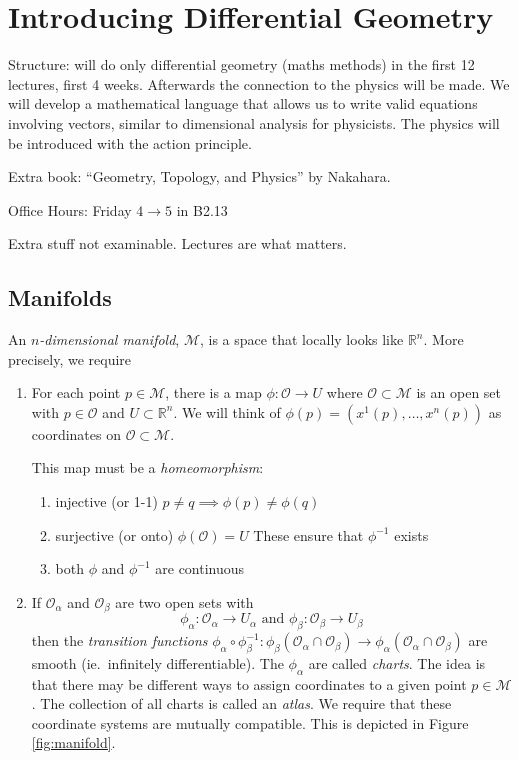 \chapter{Introducing Differential Geometry}%

Structure: will do only differential geometry (maths methods) in the first 12 lectures, first 4 weeks. Afterwards the connection to the physics will be made.
We will develop a mathematical language that allows us to write valid equations involving vectors, similar to dimensional analysis for physicists. The physics will be introduced with the action principle.

Extra book: ``Geometry, Topology, and Physics'' by Nakahara.

Office Hours: Friday $4 \rightarrow 5$ in B2.13

Extra stuff not examinable. Lectures are what matters.

\section{Manifolds}%
\label{sec:manifolds}

An \emph{$n$-dimensional manifold}, $\mathcal{M}$, is a space that locally looks like $\mathbb{R}^n$.
More precisely, we require
\begin{enumerate}
  \item For each point $p \in \mathcal{M}$, there is a map $\phi \colon \mathcal{O} \to U$ where $\mathcal{O} \subset \mathcal{M}$ is an open set with $p \in \mathcal{O}$ and $U \subset \mathbb{R}^n$.
    We will think of $\phi(p) = (x^1(p), \dots, x^n(p))$ as coordinates on $\mathcal{O} \subset \mathcal{M}$.

    This map must be a \emph{homeomorphism}:
    \begin{enumerate}
      \item injective (or 1-1) $p \neq q \implies \phi(p) \neq \phi(q)$
      \item surjective (or onto) $\phi(\mathcal{O}) = U$
	These ensure that $\phi^{-1}$ exists
      \item both $\phi$ and $\phi^{-1}$ are continuous
    \end{enumerate}
  \item If $\mathcal{O}_\alpha$ and $\mathcal{O}_\beta$ are two open sets with 
    \begin{equation}
      \phi_\alpha: \mathcal{O}_\alpha \to U_\alpha \text{ and } \phi_\beta: \mathcal{O}_\beta \to U_\beta
    \end{equation}
    then the \emph{transition functions} $\phi_\alpha \circ \phi^{-1}_\beta: \phi_\beta(\mathcal{O}_\alpha \cap \mathcal{O}_{\beta}) \to \phi_\alpha (\mathcal{O}_\alpha \cap \mathcal{O}_\beta)$ are smooth (ie.~infinitely differentiable).
    The $\phi_\alpha$ are called \emph{charts}. The idea is that there may be different ways to assign coordinates to a given point $p \in \mathcal{M}$.
    The collection of all charts is called an \emph{atlas}.
    We require that these coordinate systems are mutually compatible. This is depicted in Figure \ref{fig:manifold}.
\end{enumerate}

